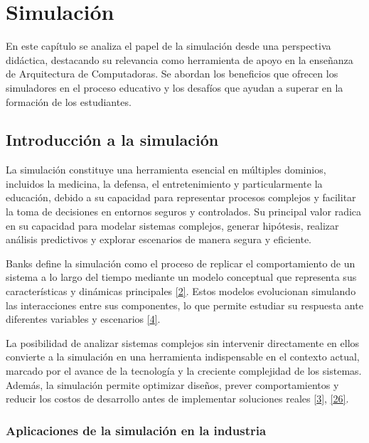 \documentclass[12pt,oneside]{templates/unerthesis}
\begin{document}
\hypertarget{simulacion}{%
\chapter{Simulación}\label{simulacion}}

En este capítulo se analiza el papel de la simulación desde una perspectiva didáctica, destacando su relevancia como herramienta de apoyo en la enseñanza de Arquitectura de Computadoras. Se abordan los beneficios que ofrecen los simuladores en el proceso educativo y los desafíos que ayudan a superar en la formación de los estudiantes.

\hypertarget{introducciuxf3n-a-la-simulaciuxf3n}{%
\section{Introducción a la simulación}\label{introducciuxf3n-a-la-simulaciuxf3n}}

La simulación constituye una herramienta esencial en múltiples dominios, incluidos la medicina, la defensa, el entretenimiento y particularmente la educación, debido a su capacidad para representar procesos complejos y facilitar la toma de decisiones en entornos seguros y controlados. Su principal valor radica en su capacidad para modelar sistemas complejos, generar hipótesis, realizar análisis predictivos y explorar escenarios de manera segura y eficiente.

Banks define la simulación como el proceso de replicar el comportamiento de un sistema a lo largo del tiempo mediante un modelo conceptual que representa sus características y dinámicas principales \protect\hyperlink{ref-banks_discrete-event_2010}{{[}2{]}}. Estos modelos evolucionan simulando las interacciones entre sus componentes, lo que permite estudiar su respuesta ante diferentes variables y escenarios \protect\hyperlink{ref-robinson_simulation_2014}{{[}4{]}}.

La posibilidad de analizar sistemas complejos sin intervenir directamente en ellos convierte a la simulación en una herramienta indispensable en el contexto actual, marcado por el avance de la tecnología y la creciente complejidad de los sistemas. Además, la simulación permite optimizar diseños, prever comportamientos y reducir los costos de desarrollo antes de implementar soluciones reales \protect\hyperlink{ref-law_simulation_2015}{{[}3{]}}, \protect\hyperlink{ref-zeigler_theory_2000}{{[}26{]}}.

\hypertarget{aplicaciones-de-la-simulaciuxf3n-en-la-industria}{%
\subsection{Aplicaciones de la simulación en la industria}\label{aplicaciones-de-la-simulaciuxf3n-en-la-industria}}
\end{document}
